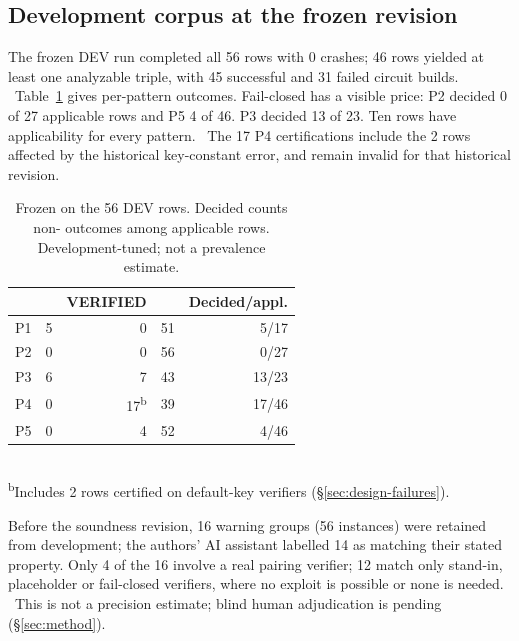 \subsection{Development corpus at the frozen revision}\label{sec:res-dev}

The frozen DEV run completed all 56 rows with 0 crashes; 46 rows yielded at
least one analyzable triple, with 45 successful and 31 failed circuit
builds.%
\
Table~\ref{tab:dev} gives per-pattern outcomes. Fail-closed has a visible
price: P2 decided 0 of 27 applicable rows and P5 4 of 46. P3 decided 13 of
23. Ten rows have \UNK{} applicability for every pattern.%
\
The 17 P4 certifications include the 2 rows affected by the historical key-constant error, and
remain invalid for that historical revision.%

\begin{table}[t]
\centering
\caption{Frozen \tool{} on the 56 DEV rows. Decided counts
non-\UNK{} outcomes among applicable rows. Development-tuned; not a
prevalence estimate.}
\label{tab:dev}
\footnotesize
\begin{tabular}{@{}lrrrr@{}}
\toprule
& \VIOL{} & \textsf{VERIFIED} & \UNK{} & \textbf{Decided/appl.} \\
\midrule
P1 & 5 & 0 & 51 & 5/17 \\
P2 & 0 & 0 & 56 & 0/27 \\
P3 & 6 & 7 & 43 & 13/23 \\
P4 & 0 & 17\textsuperscript{b} & 39 & 17/46 \\
P5 & 0 & 4 & 52 & 4/46 \\
\bottomrule
\end{tabular}
\\[2pt]{\scriptsize \textsuperscript{b}Includes 2 rows certified on default-key verifiers (\S\ref{sec:design-failures}).}
\end{table}

 Before the soundness revision, 16 warning
groups (56 instances) were retained from development; the authors' AI
assistant labelled 14 as matching their stated property. Only 4 of the 16
involve a real pairing verifier; 12 match only stand-in, placeholder or
fail-closed verifiers, where no exploit is possible or none is needed.%
\
This is not a precision estimate; blind human adjudication is pending
(\S\ref{sec:method}).

